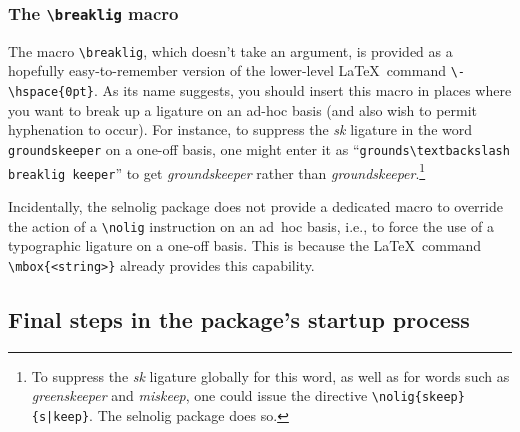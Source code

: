 \documentclass[11pt]{article}
\newcommand{\pkg}[1]{\textsf{#1}}
\newcommand{\cmmd}[1]{\texttt{\textbackslash #1}}
\begin{document}
\subsubsection{The \cmmd{breaklig} macro} 
\label{sec:breaklig}

The macro \cmmd{breaklig}, which doesn't take an argument, is provided as a hopefully easy-to-remember version of the lower-level \LaTeX\ command \Verb+\-\hspace{0pt}+. As its name suggests, you should insert this macro in places where you want to break up a ligature on an ad-hoc basis (and also wish to permit hyphenation to occur). For instance, to suppress the \emph{\mbox{sk}} ligature in the word \Verb+groundskeeper+ on a one-off basis, one might enter it as \enquote{\Verb+grounds\textbackslash breaklig keeper+} to get \emph{\ebg groundskeeper} rather than \emph{\ebg ground\mbox{sk}eeper}.\footnote{To suppress the {\ebg \emph{\mbox{sk}}} ligature globally for this word, as well as for words such as \emph{\ebg greenskeeper} and \emph{\ebg miskeep}, one could issue the directive \Verb+\nolig{skeep}{s|keep}+. The \pkg{selnolig} package does so.}


Incidentally, the \pkg{selnolig} package does not provide a dedicated macro to override the action of a \cmmd{nolig} instruction on an ad~hoc basis, i.e., to force the use of a typographic ligature on a one-off basis. This is because the \LaTeX\ command \Verb+\mbox{<string>}+ already provides this capability.


\subsection{Final steps in the package's startup process}
\end{document}
